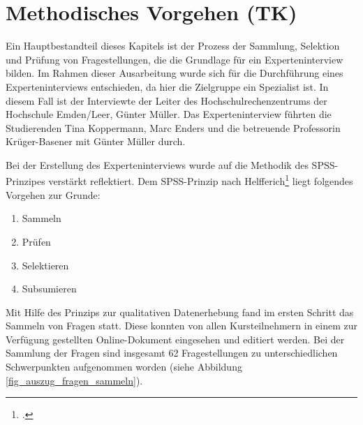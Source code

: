\section{Methodisches Vorgehen (TK)}
Ein Hauptbestandteil dieses Kapitels ist der Prozess der Sammlung, Selektion und Prüfung von Fragestellungen, die die Grundlage für ein Experteninterview bilden. Im Rahmen dieser Ausarbeitung wurde sich für die Durchführung eines Experteninterviews entschieden, da hier die Zielgruppe ein Spezialist ist. In diesem Fall ist der Interviewte der Leiter des Hochschulrechenzentrums der Hochschule Emden/Leer, Günter Müller. Das Experteninterview führten die Studierenden Tina Koppermann, Marc Enders und die betreuende Professorin Krüger-Basener mit Günter Müller durch. 

Bei der Erstellung des Experteninterviews wurde auf die Methodik des SPSS-Prinzipes verstärkt reflektiert. Dem SPSS-Prinzip nach Helfferich\footcite[Vgl.][182 ff.]{helfferich_2009} liegt folgendes Vorgehen zur Grunde:

\begin{enumerate}
	\item Sammeln
	\item Prüfen
	\item Selektieren
	\item Subsumieren		
\end{enumerate}

Mit Hilfe des Prinzips zur qualitativen Datenerhebung fand im ersten Schritt das Sammeln von Fragen statt. Diese konnten von allen Kursteilnehmern in einem zur Verfügung gestellten Online-Dokument eingesehen und editiert werden. Bei der Sammlung der Fragen sind insgesamt 62 Fragestellungen zu unterschiedlichen Schwerpunkten aufgenommen worden (siehe Abbildung \ref{fig_auszug_fragen_sammeln}).

